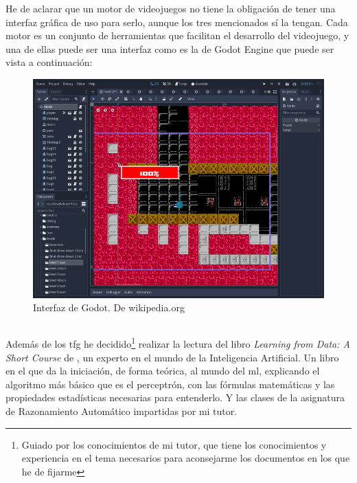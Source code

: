 He de aclarar que un motor de videojuegos no tiene la obligación de tener una interfaz gráfica de uso para serlo, aunque los tres mencionados sí la tengan. Cada motor es un conjunto de herramientas que facilitan el desarrollo del videojuego, y una de ellas puede ser una interfaz como es la de Godot Engine que puede ser vista a continuación: 
\begin{figure}[h]
	\centering
	\includegraphics[width=15cm]{archivos/imagenes/Godot-captura.png}
	\caption{Interfaz de Godot. De wikipedia.org}
\end{figure}

\subsection{}
Además de los \gls{tfg} he decidido\footnote{Guiado por los conocimientos de mi tutor, que tiene los conocimientos y experiencia en el tema necesarios para aconsejarme los documentos en los que he de fijarme} realizar la lectura del libro \textit{Learning from Data: A Short Course} de , un experto en el mundo de la Inteligencia Artificial. Un libro en el que da la iniciación, de forma teórica, al mundo del \gls{ml}, explicando el algoritmo más básico que es el perceptrón, con las fórmulas matemáticas y las propiedades estadísticas necesarias para entenderlo. Y las clases de la asignatura de Razonamiento Automático impartidas por mi tutor.

